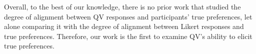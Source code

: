Overall, to the best of our knowledge, there is no prior work that studied the degree of alignment between QV responses and participants' true preferences, let alone comparing it with the degree of alignment between Likert responses and true preferences. Therefore, our work is the first to examine QV's ability to elicit true preferences.









